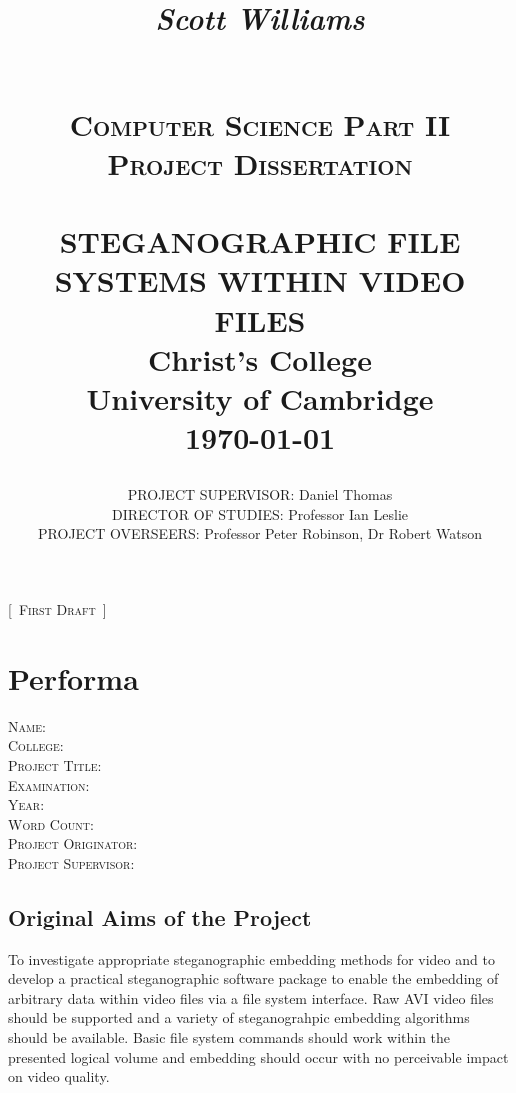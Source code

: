 \documentclass[paper=a4, fontsize=11pt,twoside]{scrartcl}
\title{
	\begin{flushright}
		\LARGE{\textit{Scott Williams}}
	\end{flushright}
	~\\[2.0cm]			
	\normalsize \textsc{Computer Science Part II Project Dissertation}\\[2.0cm]     
    \HRule{0.5pt} \\                        
    \LARGE \textbf{\uppercase{Steganographic file systems within video files}}    
    \HRule{2pt} \\[30pt]        
    \normalsize Christ's College\\[5pt]University of Cambridge\\[25pt]           
    \normalsize \today            
}
\author{
    \begin{spacing}{1.5}
        \noindent
        \uppercase{Project Supervisor}: Daniel Thomas\\    
        \uppercase{Director of Studies}: Professor Ian Leslie\\    
        \uppercase{Project Overseers}: Professor Peter Robinson, Dr Robert Watson\\
    \end{spacing}
}
\makeatletter
\numberwithin{table}{section}
\numberwithin{figure}{section}
\numberwithin{algorithm}{section}
\def\printtitle{%
    {\centering \@title\par}}
\newcommand\blankpage{%
    \null
    \thispagestyle{empty}%
    \addtocounter{page}{-1}%
    \newpage}
\makeatother
\begin{document}
\renewcommand{\thelstlisting}{\thesection.\arabic{lstlisting}}
\thispagestyle{empty}        

\printtitle                    
\vfill
\begin{center}
\huge{[~}\normalsize \textsc{First Draft}\huge{~]}
\end{center}
\afterpage{\blankpage}
\newpage
\setcounter{page}{1}        
\section*{Performa}
\textsc{Name}: \\
\textsc{College}: \\
\textsc{Project Title}: \\
\textsc{Examination}: \\
\textsc{Year}: \\
\textsc{Word Count}: \\
\textsc{Project Originator}: \\
\textsc{Project Supervisor}: \\

\subsection*{Original Aims of the Project}
To investigate appropriate steganographic embedding methods for video and to develop a practical steganographic software package to enable the embedding of arbitrary data within video files via a file system interface. Raw AVI video files should be supported and a variety of steganograhpic embedding algorithms should be available. Basic file system commands should work within the presented logical volume and embedding should occur with no perceivable impact on video quality.
\end{document}
